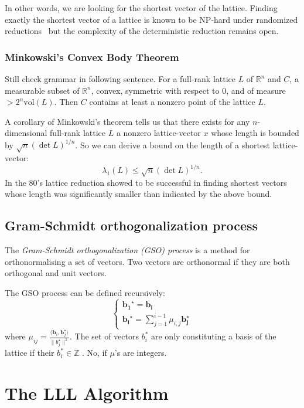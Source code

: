 \documentclass[10pt, a4paper]{article}
\newcommand{\my}[1]{{\color{blue} #1 }}
\renewcommand{\vec}[1]{\mathbf{#1}}
\begin{document}
In other words, we are looking for the shortest vector of the lattice. Finding exactly the shortest vector of a lattice is known to be NP-hard under randomized reductions~\cite{Ajtai:1998:SVP} but the complexity of the deterministic reduction remains open.

\subsubsection{Minkowski's Convex Body Theorem}
\my{Still check grammar in following sentence.}
For a full-rank lattice $L$ of $\mathbb{R}^n$ and $C$, a measurable subset of $\mathbb{R}^n$, convex, symmetric with respect to 0, and of measure $> 2^n \text{vol}(L)$. Then $C$ contains at least a nonzero point of the lattice $L$.

A corollary of Minkowski's theorem tells us that there exists for any $n$-dimensional full-rank lattice $L$ a nonzero lattice-vector $x$ whose length is bounded by $\sqrt{n} (\det L)^{1/n}$. So we can derive a bound on the length of a shortest lattice-vector:
\[
\lambda_1(L) \leq \sqrt{n} (\det L)^{1/n}.
\]
\my{In the 80's lattice reduction showed to be successful in finding shortest vectors whose length was significantly smaller than indicated by the above bound.}


\subsection{Gram-Schmidt orthogonalization process}
The \emph{Gram-Schmidt orthogonalization (\emph GSO) process} is a method for orthonormalising a set of vectors. Two vectors are orthonormal if they are both orthogonal and unit vectors. 

The GSO process  can be defined recursively:
\[
\begin{cases}
\vec{b_1}^{\star} = \vec{b_i}  \\
\vec{b_i}^{\star} = \displaystyle\sum^{i-1}_{j=1} \mu_{i,j} \vec{b_j^\star}
\end{cases}
\]
where $\mu_{ij} = \frac{\langle \vec{b}_i, \vec{b}_j^\star \rangle}{\| b_j^\star\|^2}$. The set of vectors $b_i^*$ are only constituting a basis of the lattice if their $b_i^* \in \mathbb{Z}$ \my{. No, if $\mu $'s are integers.}
 



\section{The LLL Algorithm}
\end{document}
